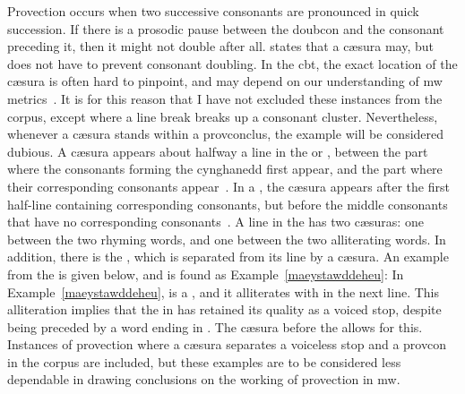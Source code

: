 Provection occurs when two successive consonants are pronounced in quick succession. If there is a prosodic pause between the \gls{doubcon} and the consonant preceding it, then it might not double after all. \Textcite[\S 392]{morris-jones_cerdd_1925} states that a cæsura may, but does not have to prevent consonant doubling. In the \gls{cbt}, the exact location of the cæsura is often hard to pinpoint, and may depend on our understanding of \gls{mw} metrics~\autocite[241]{daniel_cyfuniadau_2003}. It is for this reason that I have not excluded these instances from the corpus, except where a line break breaks up a consonant cluster. Nevertheless, whenever a cæsura stands within a \gls{provconclus}, the example will be considered dubious. A cæsura appears about halfway a line in the  or , \ie between the part where the consonants forming the cynghanedd first appear, and the part where their corresponding consonants appear~\autocite[\S 233]{morris-jones_cerdd_1925}. In a , the cæsura  appears after the first half-line containing corresponding consonants, but before the middle consonants that have no corresponding consonants~\autocite[\S 255]{morris-jones_cerdd_1925}. A line in the  has two cæsuras: one between the two rhyming words, and one between the two alliterating words. In addition, there is the , which is separated from its line by a cæsura.
%
%
%
%
An example from the  is given below, and is found as Example~\ref{maeystawddeheu}: %
In Example~\ref{maeystawddeheu},  is a , and it alliterates with  in the next line. This alliteration implies that the  in  has retained its quality as a voiced stop, despite being preceded by a word ending in . The cæsura before the  allows for this. Instances of provection where a cæsura separates a voiceless stop and a \gls{provcon} in the corpus are included, but these examples are to be considered less dependable in drawing conclusions on the working of provection in \gls{mw}.

